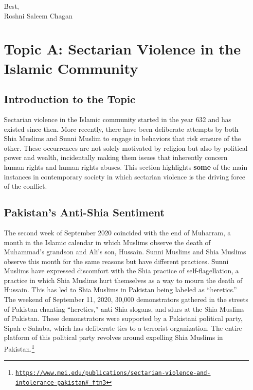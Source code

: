 \documentclass[10pt, letterpaper]{article}
\begin{document}
Best,\\
Roshni Saleem Chagan

\newpage
\tableofcontents
\newpage

\section{Topic A: Sectarian Violence in the Islamic Community}

\subsection{Introduction to the Topic}

Sectarian violence in the Islamic community started in the year 632 and
has existed since then. More recently, there have been deliberate
attempts by both Shia Muslims and Sunni Muslim to engage in behaviors
that risk erasure of the other. These occurrences are not solely
motivated by religion but also by political power and wealth,
incidentally making them issues that inherently concern human rights and
human rights abuses. This section highlights \textbf{some} of the main
instances in contemporary society in which sectarian violence is the
driving force of the conflict.

\subsection{Pakistan's Anti-Shia Sentiment}

The second week of September 2020 coincided with the end of Muharram, a
month in the Islamic calendar in which Muslims observe the death of
Muhammad's grandson and Ali's son, Hussain. Sunni Muslims and Shia
Muslims observe this month for the same reasons but have different
practices. Sunni Muslims have expressed discomfort with the Shia
practice of self-flagellation, a practice in which Shia Muslims hurt
themselves as a way to mourn the death of Hussain. This has led to Shia
Muslims in Pakistan being labeled as ``heretics.'' The weekend of
September 11, 2020, 30,000 demonstrators gathered in the streets of
Pakistan chanting ``heretics,'' anti-Shia slogans, and slurs at the Shia
Muslims of Pakistan. These demonstrators were supported by a Pakistani
political party, Sipah-e-Sahaba, which has deliberate ties to a
terrorist organization. The entire platform of this political party
revolves around expelling Shia Muslims in Pakistan.\footnote{\texttt{\href{https://www.mei.edu/publications/sectarian-violence-and-intolerance-pakistan\#_ftn3}{{https://www.mei.edu/publications/sectarian-violence-and-intolerance-pakistan\#\_ftn3}}}} \\
\end{document}
